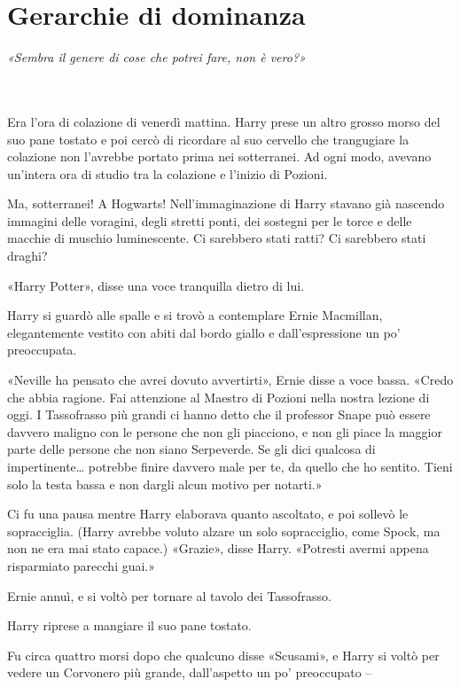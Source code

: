 
\chapter{Gerarchie di dominanza}
\label{capitolo:18}

\emph{«Sembra il genere di cose che potrei fare, non è vero?»}

~\\
~\\


Era l’ora di colazione di venerdì mattina. Harry prese un altro grosso morso del suo pane tostato e poi cercò di ricordare al suo cervello che trangugiare la colazione non l’avrebbe portato prima nei sotterranei. Ad ogni modo, avevano un’intera ora di studio tra la colazione e l’inizio di Pozioni.

Ma, sotterranei! A Hogwarts! Nell’immaginazione di Harry stavano già nascendo immagini delle voragini, degli stretti ponti, dei sostegni per le torce e delle macchie di muschio luminescente. Ci sarebbero stati ratti? Ci sarebbero stati draghi?

«Harry Potter», disse una voce tranquilla dietro di lui.

Harry si guardò alle spalle e si trovò a contemplare Ernie Macmillan, elegantemente vestito con abiti dal bordo giallo e dall’espressione un po’ preoccupata.

«Neville ha pensato che avrei dovuto avvertirti», Ernie disse a voce bassa. «Credo che abbia ragione. Fai attenzione al Maestro di Pozioni nella nostra lezione di oggi. I Tassofrasso più grandi ci hanno detto che il professor Snape può essere davvero maligno con le persone che non gli piacciono, e non gli piace la maggior parte delle persone che non siano Serpeverde. Se gli dici qualcosa di impertinente… potrebbe finire davvero male per te, da quello che ho sentito. Tieni solo la testa bassa e non dargli alcun motivo per notarti.»

Ci fu una pausa mentre Harry elaborava quanto ascoltato, e poi sollevò le sopracciglia. (Harry avrebbe voluto alzare un solo sopracciglio, come Spock, ma non ne era mai stato capace.) «Grazie», disse Harry. «Potresti avermi appena risparmiato parecchi guai.»

Ernie annuì, e si voltò per tornare al tavolo dei Tassofrasso.

Harry riprese a mangiare il suo pane tostato.

Fu circa quattro morsi dopo che qualcuno disse «Scusami», e Harry si voltò per vedere un Corvonero più grande, dall’aspetto un po’ preoccupato –

